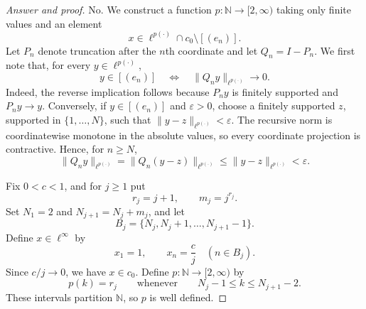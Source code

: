 \documentclass[11pt,reqno]{amsart}
\theoremstyle{plain}
\theoremstyle{definition}
\begin{document}
\begin{proof}[Answer and proof]
No. We construct a function $p\colon\mathbb N\to[2,\infty)$ taking only finite values and an element
\begin{equation*}
 x\in\ell^{p(\cdot)}\cap c_0\setminus[(e_n)].
\end{equation*}
Let $P_n$ denote truncation after the $n$th coordinate and let $Q_n=I-P_n$. We first note that, for every $y\in\ell^{p(\cdot)}$,
\begin{equation*}
    y\in[(e_n)] \quad\Longleftrightarrow\quad \|Q_ny\|_{\ell^{p(\cdot)}}\longrightarrow0.
\end{equation*}
Indeed, the reverse implication follows because $P_ny$ is finitely supported and $P_ny\to y$. Conversely, if $y\in[(e_n)]$ and $\varepsilon>0$, choose a finitely supported $z$, supported in $\{1,\ldots,N\}$, such that $\|y-z\|_{\ell^{p(\cdot)}}<\varepsilon$. The recursive norm is coordinatewise monotone in the absolute values, so every coordinate projection is contractive. Hence, for $n\geq N$,
\begin{equation*}
 \|Q_ny\|_{\ell^{p(\cdot)}}
 =\|Q_n(y-z)\|_{\ell^{p(\cdot)}}
 \leq\|y-z\|_{\ell^{p(\cdot)}}<\varepsilon.
\end{equation*}

Fix $0<c<1$, and for $j\geq1$ put
\begin{equation*}
 r_j=j+1,
 \qquad m_j=j^{r_j}.
\end{equation*}
Set $N_1=2$ and $N_{j+1}=N_j+m_j$, and let
\begin{equation*}
 B_j=\{N_j,N_j+1,\ldots,N_{j+1}-1\}.
\end{equation*}
Define $x\in\ell^\infty$ by
\begin{equation*}
 x_1=1,
 \qquad x_n=\frac cj\quad(n\in B_j).
\end{equation*}
Since $c/j\to0$, we have $x\in c_0$. Define $p\colon\mathbb N\to[2,\infty)$ by
\begin{equation*}
    p(k)=r_j \qquad\text{whenever}\qquad N_j-1\leq k\leq N_{j+1}-2.
\end{equation*}
These intervals partition $\mathbb N$, so $p$ is well defined.


\end{proof}
\end{document}
